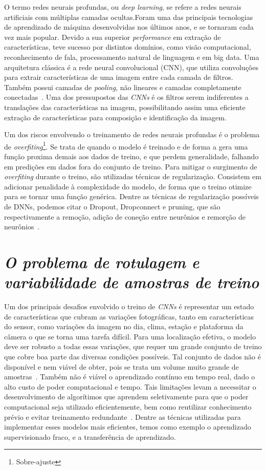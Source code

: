 O termo redes neurais profundas, ou \textit{deep learning}, se refere a redes neurais artificiais com múltiplas camadas ocultas.Foram uma das principais tecnologias de aprendizado de máquina desenvolvidas nos últimos anos, e se tornaram cada vez mais popular. Devido a sua superior \textit{performance} em extração de características, teve sucesso por distintos domínios, como visão computacional, reconhecimento de fala, processamento natural de linguagem e em big data. Uma arquitetura clássica é a rede neural convolucional (CNN), que utiliza convoluções para extrair características de uma imagem entre cada camada de filtros. Também possui camadas de \textit{pooling}, não lineares e camadas completamente conectadas~\cite{8308186}. Uma dos pressupostos das \textit{CNNs} é os filtros serem indiferentes a translações das características na imagem, possibilitando assim uma eficiente extração de características para composição e identificação da imagem.

Um dos riscos envolvendo o treinamento de redes neurais profundas é o problema de \textit{overfiting}\footnote{Sobre-ajuste}. Se trata de quando o modelo é treinado e de forma a gera uma função proxima demais aos dados de treino, e que perdem generalidade, falhando em predições em dados fora do conjunto de treino. Para mitigar o surgimento de \textit{overfiting} durante o treino, são utilizadas técnicas de regularização. Consistem em adicionar penalidade à complexidade do modelo, de forma que o treino otimize para se tornar uma função genérica. Dentre as técnicas de regularização possíveis de DNNs, podemos citar o Dropout, Dropconnect e pruning, que são respectivamente a remoção, adição de coneção entre neurônios e remorção de neurônios~\cite{hastie01statisticallearning}.

\section{\textit{O problema de rotulagem e variabilidade de amostras de treino}}\label{sec:Cap2_rotulagem}


Um dos principais desafios envolvido o treino de \textit{CNNs} é representar um estado de características que cubram as variações fotográficas, tanto em características do sensor, como variações da imagem no dia, clima, estação e plataforma da câmera o que se torna uma tarefa difícil. Para uma localização efetiva, o modelo deve ser robusto a todas essas variações, que requer um grande conjunto de treino que cobre boa parte das diversas condições possíveis. Tal conjunto de dados não é disponível e nem viável de obter, pois se trata um volume muito grande de amostras~\cite{rs13194017}. Também não é viável o aprendizado contínuo em tempo real, dado o alto custo de poder computacional e tempo. Tais limitações levam a necessitar o desenvolvimento de algorítimos que aprendem seletivamente para que o poder computacional seja utilizado eficientemente, bem como reutilizar conhecimento prévio e evitar treinamento redundante~\cite{rostami2019learning}.  Dentre as técnicas utilizadas para implementar esses modelos mais eficientes, temos como exemplo o aprendizado supervisionado fraco, e a transferência de aprendizado. 

